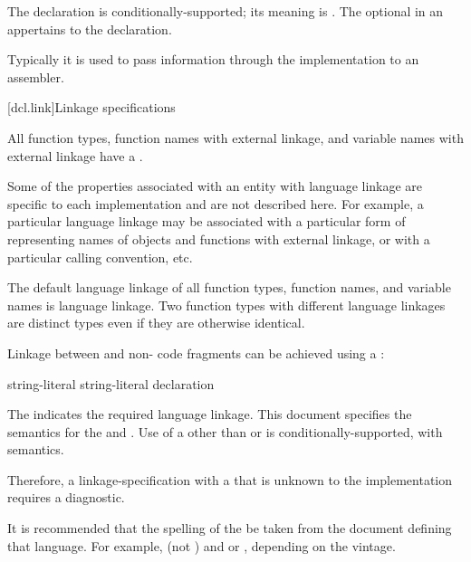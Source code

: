 The  declaration is conditionally-supported; its meaning is
.
The optional  in
an  appertains to the  declaration.
\begin{note}
Typically it is used to pass information through the implementation to
an assembler.
\end{note}

[dcl.link]{Linkage specifications}%

\pnum
All function types, function names with external linkage, and variable
names with external linkage have a .
\begin{note}
Some of the properties associated with an entity with language linkage
are specific to each implementation and are not described here. For
example, a particular language linkage may be associated with a
particular form of representing names of objects and functions with
external linkage, or with a particular calling convention, etc.
\end{note}
The default language linkage of all function types, function names, and
variable names is \Cpp{} language linkage. Two function types with
different language linkages are distinct types even if they are
otherwise identical.

\pnum
Linkage between \Cpp{} and  non-\Cpp{} code fragments can
be achieved using a :

%
%
%
\begin{bnf}
\br
     string-literal \terminal{\{}  \terminal{\}}\br
     string-literal declaration
\end{bnf}

The  indicates the required language linkage.
This document specifies the semantics for the
  and . Use of a
 other than  or  is
conditionally-supported, with  semantics.
\begin{note}
Therefore, a linkage-specification with a  that
is unknown to the implementation requires a diagnostic.
\end{note}
\begin{note}
It is recommended that the spelling of the  be
taken from the document defining that language. For example, 
(not ) and  or , depending on
the vintage.
\end{note}

